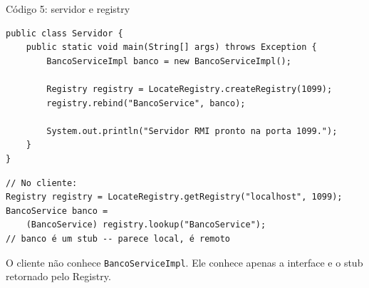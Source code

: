 \documentclass[aspectratio=169]{beamer}
\newcommand{\code}[1]{\texttt{#1}}
\begin{document}
\begin{frame}[fragile]{Código 5: servidor e registry}
\begin{lstlisting}
public class Servidor {
    public static void main(String[] args) throws Exception {
        BancoServiceImpl banco = new BancoServiceImpl();

        Registry registry = LocateRegistry.createRegistry(1099);
        registry.rebind("BancoService", banco);

        System.out.println("Servidor RMI pronto na porta 1099.");
    }
}
\end{lstlisting}

\vspace{0.2cm}
\begin{lstlisting}
// No cliente:
Registry registry = LocateRegistry.getRegistry("localhost", 1099);
BancoService banco =
    (BancoService) registry.lookup("BancoService");
// banco é um stub -- parece local, é remoto
\end{lstlisting}

\vspace{0.15cm}
\small O cliente não conhece \code{BancoServiceImpl}. Ele conhece apenas a interface e o stub retornado pelo Registry.
\end{frame}
\end{document}

